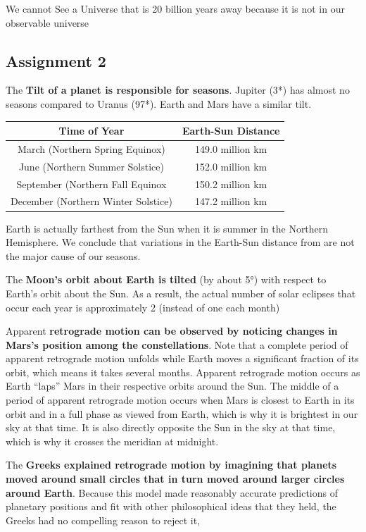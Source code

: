 \documentclass[12pt]{article}
\begin{document}
We cannot See a Universe that is 20 billion years away because it is not in our observable universe

\subsection{Assignment 2}
The {\bf Tilt of a planet is responsible for seasons}. Jupiter (3*) has almost no seasons compared to Uranus (97*). Earth and Mars have a similar tilt.

\begin{tabular}{|c|c|}
\hline
Time of Year & Earth-Sun Distance \\ \hline
March (Northern Spring Equinox) & 149.0 million km\\
June (Northern Summer Solstice) & 152.0 million km\\
September (Northern Fall Equinox & 150.2 million km\\
December (Northern Winter Solstice) & 147.2 million km\\ \hline
\end{tabular}

Earth is actually farthest from the Sun when it is summer in the Northern Hemisphere. We conclude that variations in the Earth-Sun distance from are not the major cause of our seasons.

The {\bf Moon’s orbit about Earth is tilted} (by about 5°) with respect to Earth’s orbit about the Sun. As a result, the actual number of solar eclipses that occur each year is approximately 2 (instead of one each month)

Apparent {\bf retrograde motion can be observed by noticing changes in Mars's position among the constellations}. Note that a complete period of apparent retrograde motion unfolds while Earth moves a significant fraction of its orbit, which means it takes several months. Apparent retrograde motion occurs as Earth ``laps'' Mars in their respective orbits around the Sun. The middle of a period of apparent retrograde motion occurs when Mars is closest to Earth in its orbit and in a full phase as viewed from Earth, which is why it is brightest in our sky at that time. It is also directly opposite the Sun in the sky at that time, which is why it crosses the meridian at midnight.

The {\bf Greeks explained retrograde motion by imagining that planets moved around small circles that in turn moved around larger circles around Earth}. Because this model made reasonably accurate predictions of planetary positions and fit with other philosophical ideas that they held, the Greeks had no compelling reason to reject it,
\end{document}

